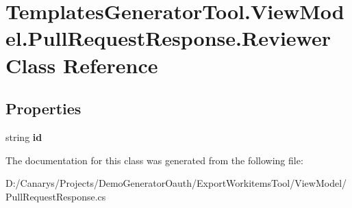 \hypertarget{class_templates_generator_tool_1_1_view_model_1_1_pull_request_response_1_1_reviewer}{}\section{Templates\+Generator\+Tool.\+View\+Model.\+Pull\+Request\+Response.\+Reviewer Class Reference}
\label{class_templates_generator_tool_1_1_view_model_1_1_pull_request_response_1_1_reviewer}
\subsection*{Properties}
\begin{DoxyCompactItemize}
\item 
\mbox{\label{class_templates_generator_tool_1_1_view_model_1_1_pull_request_response_1_1_reviewer_a67a2c7f2c0b39657ad7c7320b9376fd5}} 
string {\bfseries id}
\end{DoxyCompactItemize}


The documentation for this class was generated from the following file\+:\begin{DoxyCompactItemize}
\item 
D\+:/\+Canarys/\+Projects/\+Demo\+Generator\+Oauth/\+Export\+Workitems\+Tool/\+View\+Model/Pull\+Request\+Response.\+cs\end{DoxyCompactItemize}
